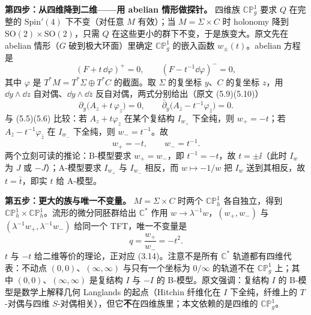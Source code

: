 \textbf{第四步：从四维降到二维——用 abelian 情形做探针。} 四维族 $\mathbb{CP}^1_g$ 要求 $Q$ 在完整的 $\mathrm{Spin}'(4)$ 下不变（对任意 $M$ 有效）；当 $M=\Sigma\times C$ 时 holonomy 降到 $\mathrm{SO}(2)\times\mathrm{SO}(2)$，只需 $Q$ 在这些更小的群下不变，于是族变大。原文先在 abelian 情形（$G$ 破到极大环面）里确定 $\mathbb{CP}^1_g$ 的嵌入函数 $w_\pm(t)$\pA{}。abelian 方程是\pA{}
\begin{equation}
(F+t\,\dd\varphi)^{+}=0,
\qquad
(F-t^{-1}\dd\varphi)^{-}=0,
\label{eq:abelian}
\end{equation}
其中 $\varphi$ 是 $T^*M=T^*\Sigma\oplus T^*C$ 的截面。取 $\Sigma$ 的复坐标 $y$、$C$ 的复坐标 $z$，用 $\dd y\wedge\dd z$ 自对偶、$\dd y\wedge\dd\bar z$ 反自对偶，两式分别给出（原文 (5.9)(5.10)）\pA{}
\begin{equation}
\partial_y\bigl(A_z+t\,\varphi_z\bigr)=0,
\qquad
\bar\partial_y\bigl(A_{\bar z}-t^{-1}\varphi_{\bar z}\bigr)=0 .
\label{eq:reduced}
\end{equation}
与 (5.5)(5.6) 比较：若 $A_z+t\varphi_z$ 在某个复结构 $I_{w_+}$ 下全纯，则 $w_+=-t$；若 $A_{\bar z}-t^{-1}\varphi_{\bar z}$ 在 $I_{w_-}$ 下全纯，则 $w_-=t^{-1}$。故\pA{}
\begin{equation}
w_+=-t,
\qquad
w_-=t^{-1}.
\label{eq:wpm}
\end{equation}
两个立刻可读的推论：B-模型要求 $w_+=w_-$，即 $t^{-1}=-t$，故 $t=\pm\ii$（此时 $I_w$ 为 $J$ 或 $-J$）；A-模型要求 $I_{w_+}$ 与 $I_{w_-}$ 相反，而 $w\mapsto-1/w$ 把 $I_w$ 送到其相反，故 $t=\bar t$，即实 $t$ 给 A-模型\pA{}。

\textbf{第五步：更大的族与唯一不变量。} $M=\Sigma\times C$ 时两个 $\mathbb{CP}^1_h$ 各自独立，得到 $\mathbb{CP}^1_h\times\mathbb{CP}^1_h$。流形的微分同胚群给出 $\mathbb{C}^*$ 作用 $w\to\lambda^{-1}w$，$(w_+,w_-)$ 与 $(\lambda^{-1}w_+,\lambda^{-1}w_-)$ 给同一个 TFT，唯一不变量是\pA{}
\begin{equation}
q=\frac{w_+}{w_-}=-t^2 .
\label{eq:q}
\end{equation}
$t$ 与 $-t$ 给二维等价的理论，正对应 (3.14)。注意不是所有 $\mathbb{C}^*$ 轨道都有四维代表：不动点 $(0,0)$、$(\infty,\infty)$ 与只有一个坐标为 $0/\infty$ 的轨道不在 $\mathbb{CP}^1_g$ 上；其中 $(0,0)$、$(\infty,\infty)$ 是复结构 $I$ 与 $-I$ 的 B-模型\pA{}。原文强调：复结构 $I$ 的 B-模型是数学上解释几何 Langlands 的起点（Hitchin 纤维化在 $I$ 下全纯，纤维上的 $T$-对偶与四维 $S$-对偶相关），但它\textbf{不}在四维族里；本文依赖的是四维的 $\mathbb{CP}^1_g$\pA{}。

